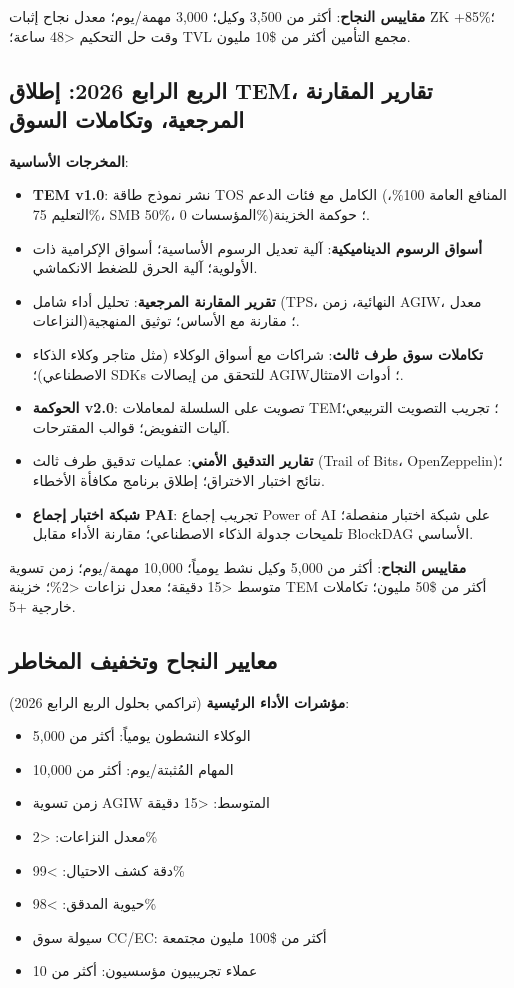 \documentclass[11pt]{article}
\begin{document}
\textbf{مقاييس النجاح}: أكثر من 3,500 وكيل؛ 3,000 مهمة/يوم؛ معدل نجاح إثبات ZK +85\%؛ وقت حل التحكيم <48 ساعة؛ TVL مجمع التأمين أكثر من \$10 مليون.

\subsection{الربع الرابع 2026: إطلاق TEM، تقارير المقارنة المرجعية، وتكاملات السوق}

\textbf{المخرجات الأساسية}:
\begin{itemize}[noitemsep]
  \item \textbf{TEM v1.0}: نشر نموذج طاقة TOS الكامل مع فئات الدعم (المنافع العامة 100\%، التعليم 75\%، SMB 50\%، المؤسسات 0\%)؛ حوكمة الخزينة.
  \item \textbf{أسواق الرسوم الديناميكية}: آلية تعديل الرسوم الأساسية؛ أسواق الإكرامية ذات الأولوية؛ آلية الحرق للضغط الانكماشي.
  \item \textbf{تقرير المقارنة المرجعية}: تحليل أداء شامل (TPS، النهائية، زمن AGIW، معدل النزاعات)؛ مقارنة مع الأساس؛ توثيق المنهجية.
  \item \textbf{تكاملات سوق طرف ثالث}: شراكات مع أسواق الوكلاء (مثل متاجر وكلاء الذكاء الاصطناعي)؛ SDKs للتحقق من إيصالات AGIW؛ أدوات الامتثال.
  \item \textbf{الحوكمة v2.0}: تصويت على السلسلة لمعاملات TEM؛ تجريب التصويت التربيعي؛ آليات التفويض؛ قوالب المقترحات.
  \item \textbf{تقارير التدقيق الأمني}: عمليات تدقيق طرف ثالث (Trail of Bits، OpenZeppelin)؛ نتائج اختبار الاختراق؛ إطلاق برنامج مكافأة الأخطاء.
  \item \textbf{شبكة اختبار إجماع PAI}: تجريب إجماع Power of AI على شبكة اختبار منفصلة؛ تلميحات جدولة الذكاء الاصطناعي؛ مقارنة الأداء مقابل BlockDAG الأساسي.
\end{itemize}

\textbf{مقاييس النجاح}: أكثر من 5,000 وكيل نشط يومياً؛ 10,000 مهمة/يوم؛ زمن تسوية متوسط <15 دقيقة؛ معدل نزاعات <2\%؛ خزينة TEM أكثر من \$50 مليون؛ تكاملات خارجية +5.

\subsection{معايير النجاح وتخفيف المخاطر}

\textbf{مؤشرات الأداء الرئيسية} (تراكمي بحلول الربع الرابع 2026):
\begin{itemize}[noitemsep]
  \item الوكلاء النشطون يومياً: أكثر من 5,000
  \item المهام المُثبتة/يوم: أكثر من 10,000
  \item زمن تسوية AGIW المتوسط: <15 دقيقة
  \item معدل النزاعات: <2\%
  \item دقة كشف الاحتيال: >99\%
  \item حيوية المدقق: >98\%
  \item سيولة سوق CC/EC: أكثر من \$100 مليون مجتمعة
  \item عملاء تجريبيون مؤسسيون: أكثر من 10
\end{itemize}
\end{document}
